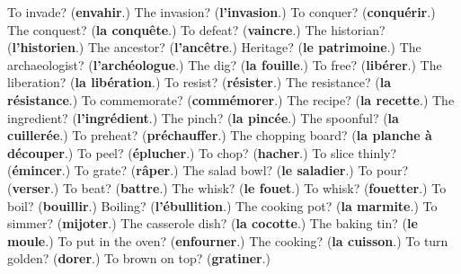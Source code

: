\begin{tcolorbox}[breakable,colback=teal!4,colframe=teal!35!black,title={Before you move on}]
To invade? (\textbf{envahir}.) The invasion? (\textbf{l'invasion}.) To conquer? (\textbf{conquérir}.) The conquest? (\textbf{la conquête}.) To defeat? (\textbf{vaincre}.) The historian? (\textbf{l'historien}.) The ancestor? (\textbf{l'ancêtre}.) Heritage? (\textbf{le patrimoine}.) The archaeologist? (\textbf{l'archéologue}.) The dig? (\textbf{la fouille}.) To free? (\textbf{libérer}.) The liberation? (\textbf{la libération}.) To resist? (\textbf{résister}.) The resistance? (\textbf{la résistance}.) To commemorate? (\textbf{commémorer}.) The recipe? (\textbf{la recette}.) The ingredient? (\textbf{l'ingrédient}.) The pinch? (\textbf{la pincée}.) The spoonful? (\textbf{la cuillerée}.) To preheat? (\textbf{préchauffer}.) The chopping board? (\textbf{la planche à découper}.) To peel? (\textbf{éplucher}.) To chop? (\textbf{hacher}.) To slice thinly? (\textbf{émincer}.) To grate? (\textbf{râper}.) The salad bowl? (\textbf{le saladier}.) To pour? (\textbf{verser}.) To beat? (\textbf{battre}.) The whisk? (\textbf{le fouet}.) To whisk? (\textbf{fouetter}.) To boil? (\textbf{bouillir}.) Boiling? (\textbf{l'ébullition}.) The cooking pot? (\textbf{la marmite}.) To simmer? (\textbf{mijoter}.) The casserole dish? (\textbf{la cocotte}.) The baking tin? (\textbf{le moule}.) To put in the oven? (\textbf{enfourner}.) The cooking? (\textbf{la cuisson}.) To turn golden? (\textbf{dorer}.) To brown on top? (\textbf{gratiner}.)
\end{tcolorbox}
